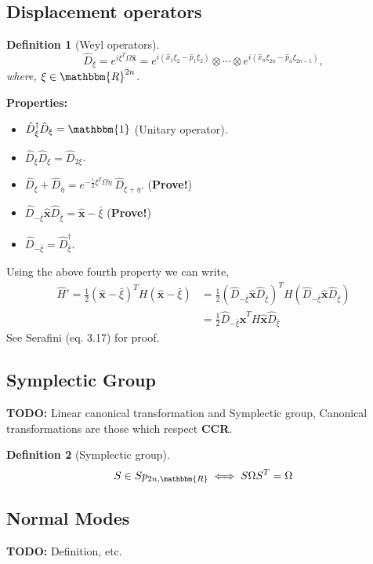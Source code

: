 \documentclass[english,10pt,a4paper]{article}
\newtheorem{definition}{Definition}
\newcommand{\xx}{\hat{\textbf{x}}}
\newcommand{\dd}[1]{\hat{D}_{#1}}
\newcommand{\half}{\frac{1}{2}}
\begin{document}
	\subsection{Displacement operators}
	\begin{definition}[Weyl operators]
		\begin{equation}
			\dd{\xi} =e^{i \xi^T \Omega \xx} = e^{i(\hat{x}_1\xi_2-\hat{p}_1\xi_2)}\otimes\cdots\otimes e^{i(\hat{x}_n\xi_{2n}-\hat{p}_n\xi_{2n-1})},
		\end{equation}
		where, $\xi \in \mathbbm{R}^{2n}$.
	\end{definition}

\textbf{Properties:}	\begin{itemize}
		\item $\dd{\xi}^\dagger \dd{\xi} = \mathbbm{1}$ (Unitary operator).
		\item $\dd{\xi}\dd{\xi}=\dd{2\xi}$.
		\item $\dd{\xi}+\dd{\eta} = e^{-\frac{i}{2}\xi^T\Omega \eta}\ \dd{\xi+\eta}$. (\textbf{Prove!})
		\item$\dd{-\bar{\xi}} \xx \dd{\bar{\xi}} = \xx - \bar{\xi}$ (\textbf{Prove!})
		\item $\dd{-\bar{\xi}} = \dd{\bar{\xi}}^\dagger$.
	\end{itemize}
	Using the above fourth property we can write,
	\begin{align}
		\hat{H}' = \half (\xx-\bar{\xi})^T H (\xx-\bar{\xi}) &= \half (\dd{-\bar{\xi}} \xx \dd{\bar{\xi}})^T H (\dd{-\bar{\xi}} \xx \dd{\bar{\xi}}) \\ &= \half \dd{-\bar{\xi}} \xx^T H \xx \dd{\bar{\xi}}
	\end{align} See Serafini (eq. 3.17) for proof.
	
	
	\subsection{Symplectic Group}
	\textbf{TODO:} Linear canonical transformation and Symplectic group, Canonical transformations are those which respect  \textbf{CCR}.
	\begin{definition}
		[Symplectic group]
		\begin{equation}
			S\in Sp_{2n,\mathbbm{R}} \iff S\Omega S^T=\Omega
		\end{equation}
	\end{definition}
	
	\subsection{Normal Modes}
	\textbf{TODO: }Definition, etc.
	
\end{document}
